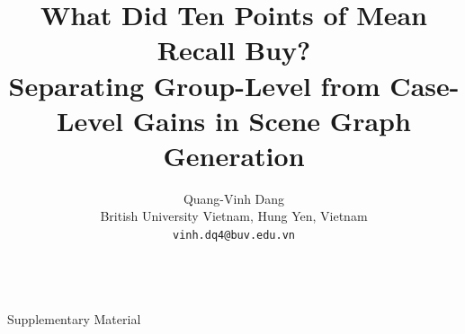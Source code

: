 \documentclass[10pt,twocolumn,letterpaper]{article}
\title{What Did Ten Points of Mean Recall Buy?\\
Separating Group-Level from Case-Level Gains in Scene Graph Generation}
\author{Quang-Vinh Dang\\
British University Vietnam, Hung Yen, Vietnam\\
{\tt\small vinh.dq4@buv.edu.vn}}
\begin{document}
\maketitle









{
    \small
    
    
}

\clearpage
\setcounter{page}{1}
\onecolumn
\begin{center}
{\Large\textbf{\thetitle}}\\[0.5em]
{\Large Supplementary Material}\\[1.0em]
\end{center}
\appendix






\end{document}
